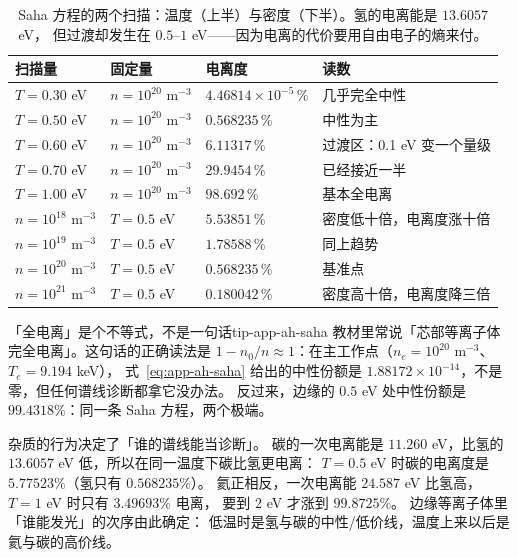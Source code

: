 \begin{table}[htbp]
\centering
\small
\caption{Saha 方程的两个扫描：温度（上半）与密度（下半）。氢的电离能是 $13.6057$ eV，
但过渡却发生在 $0.5$--$1$ eV——因为电离的代价要用自由电子的熵来付。}
\label{tab:app-ah-saha}
\begin{tabular}{p{2.6cm}p{2.2cm}p{2.3cm}p{5.0cm}}
\toprule
扫描量 & 固定量 & 电离度 & 读数 \\
\midrule
$T=0.30$ eV & $n=10^{20}$ m$^{-3}$ & $4.46814\times10^{-5}$\,\% & 几乎完全中性 \\
$T=0.50$ eV & $n=10^{20}$ m$^{-3}$ & $0.568235$\,\% & 中性为主 \\
$T=0.60$ eV & $n=10^{20}$ m$^{-3}$ & $6.11317$\,\% & 过渡区：0.1 eV 变一个量级 \\
$T=0.70$ eV & $n=10^{20}$ m$^{-3}$ & $29.9454$\,\% & 已经接近一半 \\
$T=1.00$ eV & $n=10^{20}$ m$^{-3}$ & $98.692$\,\% & 基本全电离 \\
\midrule
$n=10^{18}$ m$^{-3}$ & $T=0.5$ eV & $5.53851$\,\% & 密度低十倍，电离度涨十倍 \\
$n=10^{19}$ m$^{-3}$ & $T=0.5$ eV & $1.78588$\,\% & 同上趋势 \\
$n=10^{20}$ m$^{-3}$ & $T=0.5$ eV & $0.568235$\,\% & 基准点 \\
$n=10^{21}$ m$^{-3}$ & $T=0.5$ eV & $0.180042$\,\% & 密度高十倍，电离度降三倍 \\
\bottomrule
\end{tabular}

\end{table}

\begin{tip}{「全电离」是个不等式，不是一句话}{tip-app-ah-saha}
教材里常说「芯部等离子体完全电离」。这句话的正确读法是
$1-n_0/n \approx 1$：在主工作点（$n_e=10^{20}$ m$^{-3}$、$T_e=9.194$ keV），
式~\eqref{eq:app-ah-saha} 给出的中性份额是 $1.88172\times10^{-14}$，不是零，但任何谱线诊断都拿它没办法。
反过来，边缘的 $0.5$ eV 处中性份额是 $99.4318\%$：同一条 Saha 方程，两个极端。
\end{tip}

杂质的行为决定了「谁的谱线能当诊断」。
碳的一次电离能是 $11.260$ eV，比氢的 $13.6057$ eV 低，所以在同一温度下碳比氢更电离：
$T=0.5$ eV 时碳的电离度是 $5.77523\%$（氢只有 $0.568235\%$）。
氦正相反，一次电离能 $24.587$ eV 比氢高，$T=1$ eV 时只有 $3.49693\%$ 电离，
要到 $2$ eV 才涨到 $99.8725\%$。
边缘等离子体里「谁能发光」的次序由此确定：
低温时是氢与碳的中性/低价线，温度上来以后是氦与碳的高价线。


